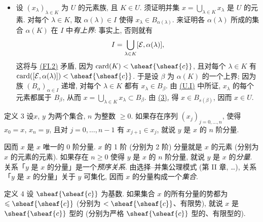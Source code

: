 \begin{itemize}
\hypertarget{sga4.exp.I.appendix.II.sec.5.theorem.1.proof.clause.U.IV}{}
\item[(U.IV)] 设 $(x_\lambda)_{\lambda\in K}$ 为 $U$ 的元素族, 且 $K\in U$. 须证明并集 $x=\bigcup_{\lambda\in K}x_\lambda$ 是 $U$ 的元素. 对每个 $\lambda\in K$, 取 $\alpha(\lambda)\in I$ 使得 $x_\lambda\in B_{\alpha(\lambda)}$. 来证明各 $\alpha(\lambda)$ 所成的集合 $\alpha(K)$ 在 $I$ 中\emph{有上界}: 事实上, 否则就有
$$
I=\bigcup_{\lambda%
\in K}[\mathcal{E},\alpha(\lambda)]{\quoi},
$$
这将与 \hyperlink{sga4.exp.I.appendix.II.sec.5.definition.2.condition.FI.2}{(FI.2)} 矛盾, 因为 $\card(K)<\sheaf{\sheaf{c}}$, 且对每个 $\lambda\in K$ 有 $\card([\mathcal{E},\alpha(\lambda)])<\sheaf{\sheaf{c}}$. 于是设 $\beta$ 为 $\alpha(K)$ 的一个上界; 因为族 $(B_\alpha)_{\alpha\in I}$ 递增, 对每个 $\lambda\in K$ 都有 $x_\lambda\in B_\beta$. 由 \hyperlink{sga4.exp.I.appendix.II.sec.5.theorem.1.proof.clause.U.I}{(U.I)} 中所证, $x_\lambda$ 的每个元素都属于 $B_\beta$, 从而 $x=\bigcup_{\lambda\in K}x_\lambda\subset B_\beta$. 由 \hyperlink{sga4.exp.I.appendix.II.sec.5.theorem.1.proof.equation.3}{(3)}, 得 $x\in B_{s(\beta)}$, 因而 $x\in U$. \cqfd
\end{itemize}



\hypertarget{sga4.exp.I.appendix.II.sec.5.definition.3}{}
\begin{enonce*}{定义 3}
设\pageoriginale $x$, $y$ 为两个集合, $n$ 为整数 $\geq 0$. 如果存在序列 $(x_j)_{j=0,\ldots,n}$, 使得 $x_0=x$, $x_n=y$, 且对 $j=0,\ldots,n-1$ 有 $x_{j+1}\in x_j$, 就说 $y$ 是 $x$ 的 $n$ 阶分量.
\end{enonce*}

因而 $x$ 是 $x$ 唯一的 0 阶分量. $x$ 的 1 阶 (分别为 2 阶) 分量就是 $x$ 的元素 (分别为 $x$ 的元素的元素). 如果存在 $n\geq 0$ 使得 $y$ 是 $x$ 的 $n$ 阶分量, 就说 $y$ 是 $x$ 的\emph{分量}. 关系「$y$ 是 $x$ 的分量」是一个\emph{预序关系}. 由选择--并集公理模式 (第 II 章, \ldots), 关系「$y$ 是 $x$ 的分量」关于 $y$ 可集化, 因而 $x$ 的分量构成一个\emph{集合}.

\hypertarget{sga4.exp.I.appendix.II.sec.5.definition.4}{}
\begin{enonce*}{定义 4}
设 $\sheaf{\sheaf{c}}$ 为基数. 如果集合 $x$ 的所有分量的势都为 $\leq \sheaf{\sheaf{c}}$ (分别为 $<\sheaf{\sheaf{c}}$、有限势), 就说 $x$ 是 $\sheaf{\sheaf{c}}$ 型的 (分别为严格 $\sheaf{\sheaf{c}}$ 型的、有限型的).
\end{enonce*}

